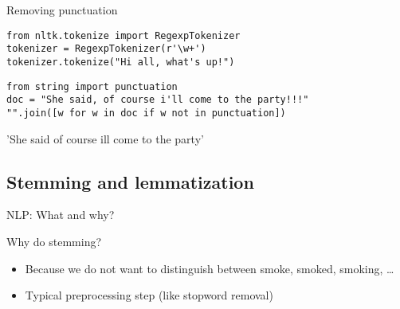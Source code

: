 \begin{frame}[fragile]{Removing punctuation}
	\begin{lstlisting}
from nltk.tokenize import RegexpTokenizer
tokenizer = RegexpTokenizer(r'\w+')
tokenizer.tokenize("Hi all, what's up!")
	\end{lstlisting}  
	\begin{lstlistingoutputtiny}
	\end{lstlistingoutputtiny}
	\begin{lstlisting}
from string import punctuation
doc = "She said, of course i'll come to the party!!!"
"".join([w for w in doc if w not in punctuation])
\end{lstlisting}  
	\begin{lstlistingoutputtiny}
'She said of course ill come to the party'
	\end{lstlistingoutputtiny}
	
\end{frame}

\subsection{Stemming and lemmatization}


\begin{frame}{NLP: What and why?}
	\begin{block}{Why do stemming?}
		\begin{itemize}
			\item Because we do not want to distinguish between smoke, smoked, smoking, \ldots
			\item Typical preprocessing step (like stopword removal)
		\end{itemize}
	\end{block}
\end{frame}

